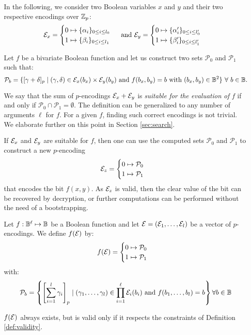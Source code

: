 In the following, we consider two Boolean variables $x$ and $y$ and their two respective encodings over $\mathbb{Z}_p$: 
\begin{equation}
\mathcal{E}_x = 
\begin{cases} 0 \mapsto \{\alpha_i\}_{0 \le i \le l_0} \\ 1 \mapsto \{\beta_i\}_{0 \le i \le l_1} \end{cases} \text{ and } \mathcal{E}_y = \begin{cases} 0 \mapsto \{\alpha'_i\}_{0 \le i \le l'_0} \\ 1 \mapsto \{\beta'_i\}_{0 \le i \le l'_1} \end{cases}
\label{eq:encoding_definition}
\end{equation}


Let $f$ be a bivariate Boolean function and let us construct two sets $\mathcal{P}_0$ and $\mathcal{P}_1$ such that:
\begin{equation}
    \mathcal{P}_b = \{[\gamma + \delta]_p \mid (\gamma, \delta) \in \mathcal{E}_x(b_x) \times \mathcal{E}_y(b_y) \text{ and } f(b_x, b_y) = b \text{ with } (b_x, b_y) \in \mathbb{B}^2\}~\forall~b \in \mathbb{B}.
    \label{def:sets_p}
\end{equation}

We say that the sum of $p$-encodings $\mathcal{E}_x + \mathcal{E}_y$ is \emph{suitable for the evaluation of $f$} if and only if $\mathcal{P}_0 \cap \mathcal{P}_1 = \emptyset$. The definition can be generalized to any number of arguments $\ell$ for $f$. For a given $f$, finding such correct encodings is not trivial. We elaborate further on this point in Section \ref{sec:search}. 

If $\mathcal{E}_x$ and $\mathcal{E}_y$ are suitable for $f$, then one can use the computed sets $\mathcal{P}_0$ and $\mathcal{P}_1$ to construct a new $p$-encoding \[\mathcal{E}_z = \begin{cases} 0 \mapsto \mathcal{P}_0 \\ 1 \mapsto \mathcal{P}_1 \end{cases}\] that encodes the bit $f(x, y)$. As $\mathcal{E}_z$ is valid, then the clear value of the bit can be recovered by decryption, or further computations can be performed without the need of a bootstrapping. 


\begin{definition}
    Let $f:\mathbb{B}^\ell \mapsto \mathbb{B}$ be a Boolean function and let $\mathbf {\mathcal{E}} = (\mathcal{E}_1, \dots, \mathcal{E}_l)$ be a vector of $p$-encodings. We define $f(\mathbf {\mathcal{E}})$ by:
    \[f(\mathbf {\mathcal{E}}) = \begin{cases} 0 \mapsto \mathcal{P}_0 \\ 1 \mapsto \mathcal{P}_1 \end{cases}\]
    with: 
    \[\mathcal{P}_b = \left \{ \left [ \sum_{i=1}^{l} \gamma_i \right ]_p \mid (\gamma_1, \dots, \gamma_l) \in \prod_{i=1}^\ell \mathcal{E}_i(b_i) \text{ and } f(b_1, \dots, b_l) = b \right \} \forall b \in \mathbb{B}\]

$f(\mathbf {\mathcal{E}})$ always exists, but is valid only if it respects the constraints of Definition \ref{def:validity}.
\end{definition}


